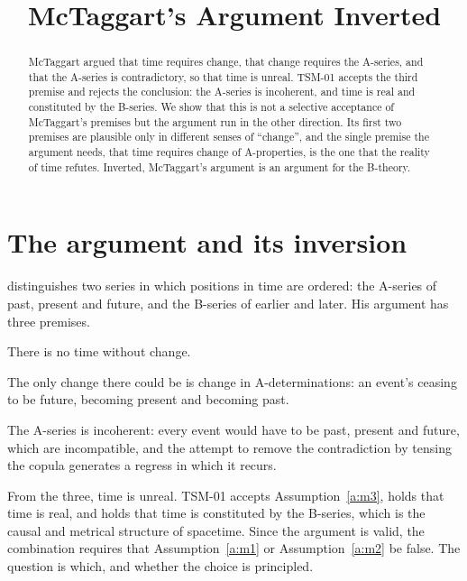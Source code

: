 \documentclass{situationist-preprint}
\title{McTaggart's Argument Inverted}
\begin{document}
\maketitle

\begin{abstract}
McTaggart argued that time requires change, that change requires the A-series, and that the A-series is contradictory, so that time is unreal. TSM-01 accepts the third premise and rejects the conclusion: the A-series is incoherent, and time is real and constituted by the B-series. We show that this is not a selective acceptance of McTaggart's premises but the argument run in the other direction. Its first two premises are plausible only in different senses of \enquote{change}, and the single premise the argument needs, that time requires change of A-properties, is the one that the reality of time refutes. Inverted, McTaggart's argument is an argument for the B-theory.
\end{abstract}

\section{The argument and its inversion}

\citet{McTaggart1908} distinguishes two series in which positions in time are ordered: the A-series of past, present and future, and the B-series of earlier and later. His argument has three premises.

\begin{assumption}\label{a:m1}
There is no time without change.
\end{assumption}

\begin{assumption}\label{a:m2}
The only change there could be is change in A-determinations: an event's ceasing to be future, becoming present and becoming past.
\end{assumption}

\begin{assumption}[Incoherence]\label{a:m3}
The A-series is incoherent: every event would have to be past, present and future, which are incompatible, and the attempt to remove the contradiction by tensing the copula generates a regress in which it recurs.
\end{assumption}

From the three, time is unreal. TSM-01 accepts Assumption~\ref{a:m3}, holds that time is real, and holds that time is constituted by the B-series, which is the causal and metrical structure of spacetime. Since the argument is valid, the combination requires that Assumption~\ref{a:m1} or Assumption~\ref{a:m2} be false. The question is which, and whether the choice is principled.
\end{document}
